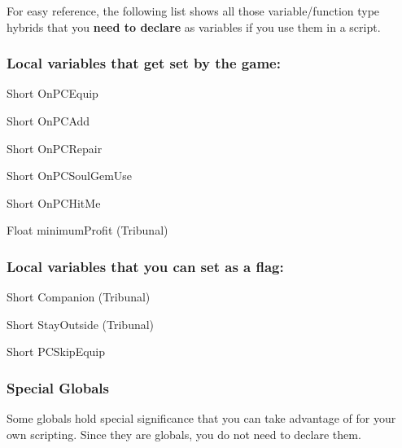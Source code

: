 For easy reference, the following list shows all those variable/function
type hybrids that you \textbf{need to declare} as variables if you use
them in a script.

\hypertarget{local-variables-that-get-set-by-the-game}{%
\subsubsection{Local variables that get set by the
game:}\label{local-variables-that-get-set-by-the-game}}

Short OnPCEquip

Short OnPCAdd

Short OnPCRepair

Short OnPCSoulGemUse

Short OnPCHitMe

Float minimumProfit (Tribunal)

\hypertarget{local-variables-that-you-can-set-as-a-flag}{%
\subsubsection{Local variables that you can set as a
flag:}\label{local-variables-that-you-can-set-as-a-flag}}

Short Companion (Tribunal)

Short StayOutside (Tribunal)

Short PCSkipEquip

\hypertarget{special-globals}{%
\subsubsection{Special Globals}\label{special-globals}}

Some globals hold special significance that you can take advantage of
for your own scripting. Since they are globals, you do not need to
declare them.

